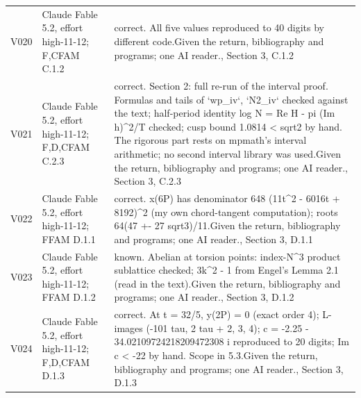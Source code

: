 \documentclass[11pt,a4paper]{article}
\theoremstyle{plain}
\theoremstyle{definition}
\begin{document}
\begin{longtable}{@{}L{.08\linewidth}L{.31\linewidth}L{.56\linewidth}@{}}
V020 & Claude Fable 5.2, effort high-11-12; F,C\newline FAM C.1.2 & correct. All five values reproduced to 40 digits by different code.\newline Given the return, bibliography and programs; one AI reader.\newline {}, Section 3, C.1.2\\
V021 & Claude Fable 5.2, effort high-11-12; F,D,C\newline FAM C.2.3 & correct. Section 2:\allowbreak{} full re-run of the interval proof. Formulas and tails of `wp\_\allowbreak{}iv`, `N2\_\allowbreak{}iv` checked against the text; half-period identity log N = Re H - pi (Im h)\textasciicircum{}2/\allowbreak{}T checked; cusp bound 1.0814 < sqrt2 by hand. The rigorous part rests on mpmath's interval arithmetic; no second interval library was used.\newline Given the return, bibliography and programs; one AI reader.\newline {}, Section 3, C.2.3\\
V022 & Claude Fable 5.2, effort high-11-12; F\newline FAM D.1.1 & correct. x(6P) has denominator 648 (11t\textasciicircum{}2 - 6016t + 8192)\textasciicircum{}2 (my own chord-tangent computation); roots 64(47 +- 27 sqrt3)/\allowbreak{}11.\newline Given the return, bibliography and programs; one AI reader.\newline {}, Section 3, D.1.1\\
V023 & Claude Fable 5.2, effort high-11-12; F\newline FAM D.1.2 & known. Abelian at torsion points:\allowbreak{} index-N\textasciicircum{}3 product sublattice checked; 3k\textasciicircum{}2 - 1 from Engel's Lemma 2.1 (read in the text).\newline Given the return, bibliography and programs; one AI reader.\newline {}, Section 3, D.1.2\\
V024 & Claude Fable 5.2, effort high-11-12; F,D,C\newline FAM D.1.3 & correct. At t = 32/\allowbreak{}5, y(2P) = 0 (exact order 4); L-images (-101 tau, 2 tau + 2, 3, 4); c = -2.25 - 34.0210972421\allowbreak{}8209472308 i reproduced to 20 digits; Im c < -22 by hand. Scope in 5.3.\newline Given the return, bibliography and programs; one AI reader.\newline {}, Section 3, D.1.3\\

\end{longtable}
\end{document}
